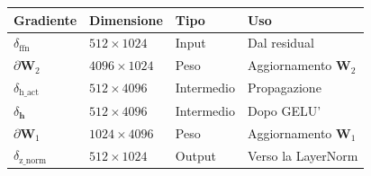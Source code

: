 \documentclass[12pt,a4paper]{article}
\begin{document}
\begin{notabox}
\begin{center}
\begin{tabular}{@{}llll@{}}
\toprule
\textbf{Gradiente} & \textbf{Dimensione} & \textbf{Tipo} & \textbf{Uso} \\
\midrule
$\delta_{\text{ffn}}$ & $512 \times 1024$ & Input & Dal residual \\
$\partial\mathbf{W}_2$ & $4096 \times 1024$ & Peso & Aggiornamento $\mathbf{W}_2$ \\
$\delta_{\text{h\_act}}$ & $512 \times 4096$ & Intermedio & Propagazione \\
$\delta_{\mathbf{h}}$ & $512 \times 4096$ & Intermedio & Dopo GELU' \\
$\partial\mathbf{W}_1$ & $1024 \times 4096$ & Peso & Aggiornamento $\mathbf{W}_1$ \\
$\delta_{\text{z\_norm}}$ & $512 \times 1024$ & Output & Verso la LayerNorm \\
\bottomrule
\end{tabular}
\end{center}
\end{notabox}
\end{document}
